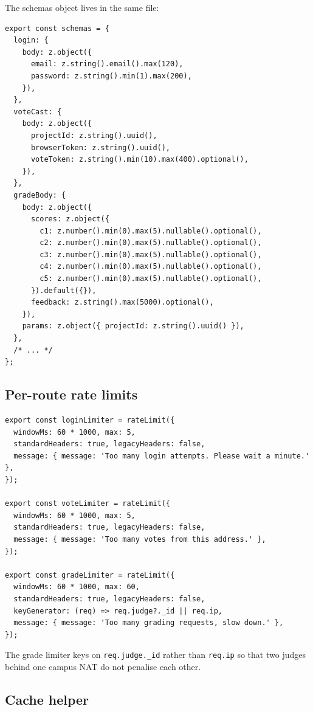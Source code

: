 The schemas object lives in the same file:

\begin{lstlisting}[caption={Schemas (excerpt)},label={lst:schemas}]
export const schemas = {
  login: {
    body: z.object({
      email: z.string().email().max(120),
      password: z.string().min(1).max(200),
    }),
  },
  voteCast: {
    body: z.object({
      projectId: z.string().uuid(),
      browserToken: z.string().uuid(),
      voteToken: z.string().min(10).max(400).optional(),
    }),
  },
  gradeBody: {
    body: z.object({
      scores: z.object({
        c1: z.number().min(0).max(5).nullable().optional(),
        c2: z.number().min(0).max(5).nullable().optional(),
        c3: z.number().min(0).max(5).nullable().optional(),
        c4: z.number().min(0).max(5).nullable().optional(),
        c5: z.number().min(0).max(5).nullable().optional(),
      }).default({}),
      feedback: z.string().max(5000).optional(),
    }),
    params: z.object({ projectId: z.string().uuid() }),
  },
  /* ... */
};
\end{lstlisting}

\subsection{Per-route rate limits}

\begin{lstlisting}[caption={\texttt{server/middleware/limits.js}},label={lst:limits}]
export const loginLimiter = rateLimit({
  windowMs: 60 * 1000, max: 5,
  standardHeaders: true, legacyHeaders: false,
  message: { message: 'Too many login attempts. Please wait a minute.' },
});

export const voteLimiter = rateLimit({
  windowMs: 60 * 1000, max: 5,
  standardHeaders: true, legacyHeaders: false,
  message: { message: 'Too many votes from this address.' },
});

export const gradeLimiter = rateLimit({
  windowMs: 60 * 1000, max: 60,
  standardHeaders: true, legacyHeaders: false,
  keyGenerator: (req) => req.judge?._id || req.ip,
  message: { message: 'Too many grading requests, slow down.' },
});
\end{lstlisting}

The grade limiter keys on \texttt{req.judge._id} rather than \texttt{req.ip}
so that two judges behind one campus NAT do not penalise each other.

\subsection{Cache helper}


